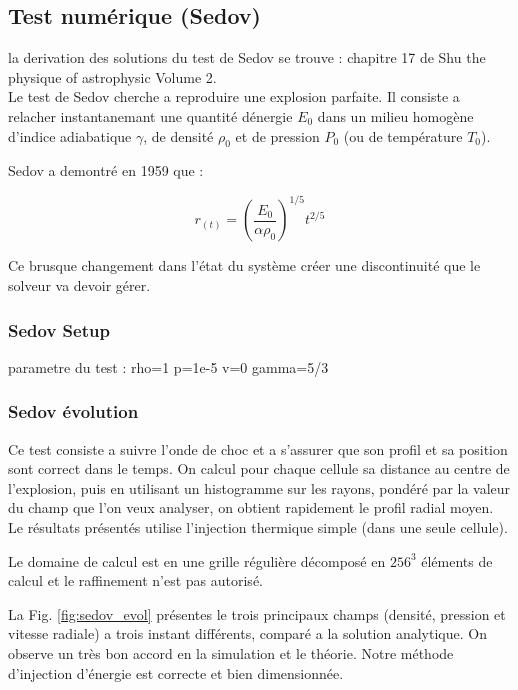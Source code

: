 \subsection{Test numérique (Sedov)}

la derivation des solutions du test de Sedov se trouve :
chapitre 17 de Shu the physique of astrophysic Volume 2.\\

Le test de Sedov cherche a reproduire une explosion parfaite.
Il consiste a relacher instantanemant une quantité dénergie $E_0$ dans un milieu homogène d'indice adiabatique $\gamma$, de densité $\rho_0$ et de pression $P_0$ (ou de température $T_0$).

Sedov a demontré en 1959 que :

\begin{equation}
r_{(t)}=\left( \frac{E_0}{\alpha \rho_0 }\right)^{1/5} t^{2/5}
\end{equation}



Ce brusque changement dans l'état du système créer une discontinuité que le solveur va devoir gérer.


\subsubsection{Sedov Setup}

parametre du test :
rho=1
p=1e-5
v=0
gamma=5/3

\subsubsection{Sedov évolution}

Ce test consiste a suivre l'onde de choc et a s'assurer que son profil et sa position sont correct dans le temps.
On calcul pour chaque cellule sa distance au centre de l'explosion, puis en utilisant un histogramme sur les rayons, pondéré par la valeur du champ que l'on veux analyser, on obtient rapidement le profil radial moyen.
Le résultats présentés utilise l'injection thermique simple (dans une seule cellule).

Le domaine de calcul est en une grille régulière décomposé en $256^3$ éléments  de calcul et le raffinement n'est pas autorisé.

La Fig. \ref{fig:sedov_evol} présentes le trois principaux champs (densité, pression et vitesse radiale) a trois instant différents, comparé a la solution analytique.
On observe un très bon accord en la simulation et le théorie.
Notre méthode d'injection d'énergie est correcte et bien dimensionnée.

